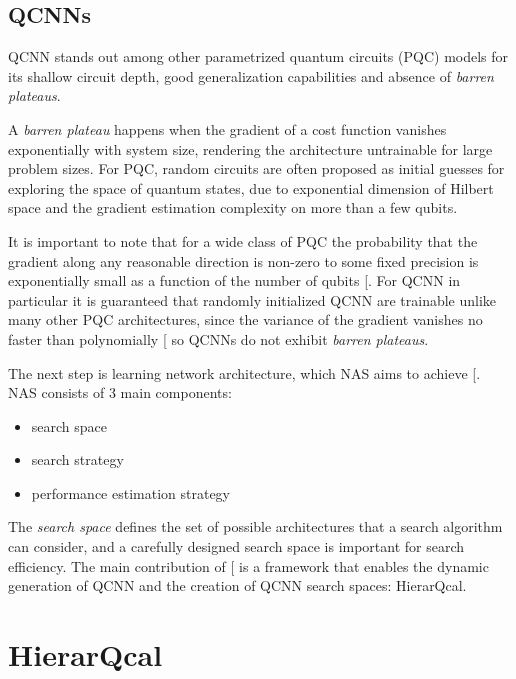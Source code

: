 \documentclass[
  13pt,
  a4paper,
  DIV=11,
  numbers=noendperiod]{scrreprt}
\providecommand{\tightlist}{%
  \setlength{\itemsep}{0pt}\setlength{\parskip}{0pt}}\usepackage{longtable,booktabs,array}
\begin{document}
\subsection{QCNNs}\label{qcnns}

QCNN stands out among other parametrized quantum circuits (PQC) models
for its shallow circuit depth, good generalization capabilities and
absence of \emph{barren plateaus}.

A \emph{barren plateau} happens when the gradient of a cost function
vanishes exponentially with system size, rendering the architecture
untrainable for large problem sizes. For PQC, random circuits are often
proposed as initial guesses for exploring the space of quantum states,
due to exponential dimension of Hilbert space and the gradient
estimation complexity on more than a few qubits.

It is important to note that for a wide class of PQC the probability
that the gradient along any reasonable direction is non-zero to some
fixed precision is exponentially small as a function of the number of
qubits {[}\citeproc{ref-McClean2018Nov}{3}{]}. For QCNN in particular it
is guaranteed that randomly initialized QCNN are trainable unlike many
other PQC architectures, since the variance of the gradient vanishes no
faster than polynomially {[}\citeproc{ref-Pesah2021Oct}{4}{]} so QCNNs
do not exhibit \emph{barren plateaus}.

The next step is learning network architecture, which NAS aims to
achieve {[}\citeproc{ref-elsken2019neural}{5}{]}. NAS consists of 3 main
components:

\begin{itemize}
\tightlist
\item
  search space
\item
  search strategy
\item
  performance estimation strategy
\end{itemize}

The \emph{search space} defines the set of possible architectures that a
search algorithm can consider, and a carefully designed search space is
important for search efficiency. The main contribution of
{[}\citeproc{ref-lourens2023hierarchical}{1}{]} is a framework that
enables the dynamic generation of QCNN and the creation of QCNN search
spaces: HierarQcal.

\section{HierarQcal}\label{hierarqcal}
\end{document}
